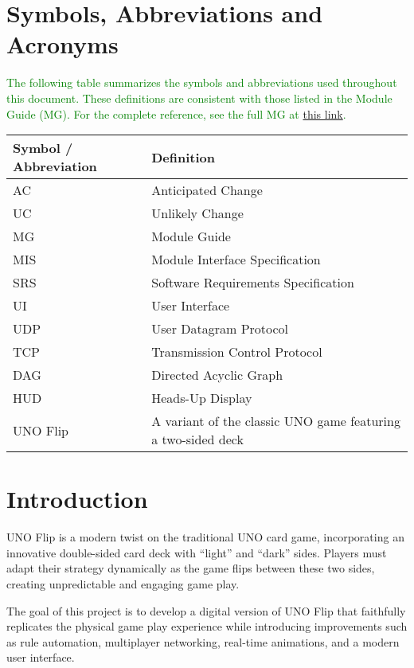 \documentclass[12pt, titlepage]{article}
\newcommand{\added}[1]{\textcolor{green}{#1}}
\begin{document}
\section{Symbols, Abbreviations and Acronyms}

\added{The following table summarizes the symbols and abbreviations used throughout this document. These definitions are consistent with those listed in the Module Guide (MG). For the complete reference, see the full MG at \href{https://github.com/simon-0215/UNO-Flip-3D/blob/main/docs/Design/SoftArchitecture/MG.pdf}{this link}.}

\renewcommand{\arraystretch}{1.2}
\begin{longtable}{p{} p{}}
\toprule
\textbf{Symbol / Abbreviation} & \textbf{Definition} \\
\midrule
AC & Anticipated Change \\
UC & Unlikely Change \\
MG & Module Guide \\
MIS & Module Interface Specification \\
SRS & Software Requirements Specification \\
UI & User Interface \\
UDP & User Datagram Protocol \\
TCP & Transmission Control Protocol \\
DAG & Directed Acyclic Graph \\
HUD & Heads-Up Display \\
UNO Flip & A variant of the classic UNO game featuring a two-sided deck \\
\bottomrule
\end{longtable}

\newpage

\tableofcontents

\newpage


\section{Introduction}

UNO Flip is a modern twist on the traditional UNO card game, incorporating an innovative double-sided card deck with “light” and “dark” sides. Players must adapt their strategy dynamically as the game flips between these two sides, creating unpredictable and engaging game play.

The goal of this project is to develop a digital version of UNO Flip that faithfully replicates the physical game play experience while introducing improvements such as rule automation, multiplayer networking, real-time animations, and a modern user interface.
\end{document}
